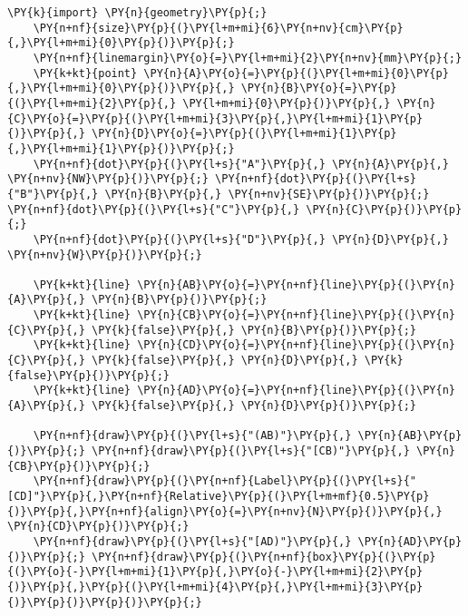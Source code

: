 \begin{Verbatim}[commandchars=\\\{\}]
    \PY{k}{import} \PY{n}{geometry}\PY{p}{;}
    \PY{n+nf}{size}\PY{p}{(}\PY{l+m+mi}{6}\PY{n+nv}{cm}\PY{p}{,}\PY{l+m+mi}{0}\PY{p}{)}\PY{p}{;}
    \PY{n+nf}{linemargin}\PY{o}{=}\PY{l+m+mi}{2}\PY{n+nv}{mm}\PY{p}{;}
    \PY{k+kt}{point} \PY{n}{A}\PY{o}{=}\PY{p}{(}\PY{l+m+mi}{0}\PY{p}{,}\PY{l+m+mi}{0}\PY{p}{)}\PY{p}{,} \PY{n}{B}\PY{o}{=}\PY{p}{(}\PY{l+m+mi}{2}\PY{p}{,} \PY{l+m+mi}{0}\PY{p}{)}\PY{p}{,} \PY{n}{C}\PY{o}{=}\PY{p}{(}\PY{l+m+mi}{3}\PY{p}{,}\PY{l+m+mi}{1}\PY{p}{)}\PY{p}{,} \PY{n}{D}\PY{o}{=}\PY{p}{(}\PY{l+m+mi}{1}\PY{p}{,}\PY{l+m+mi}{1}\PY{p}{)}\PY{p}{;}
    \PY{n+nf}{dot}\PY{p}{(}\PY{l+s}{"A"}\PY{p}{,} \PY{n}{A}\PY{p}{,} \PY{n+nv}{NW}\PY{p}{)}\PY{p}{;} \PY{n+nf}{dot}\PY{p}{(}\PY{l+s}{"B"}\PY{p}{,} \PY{n}{B}\PY{p}{,} \PY{n+nv}{SE}\PY{p}{)}\PY{p}{;} \PY{n+nf}{dot}\PY{p}{(}\PY{l+s}{"C"}\PY{p}{,} \PY{n}{C}\PY{p}{)}\PY{p}{;}
    \PY{n+nf}{dot}\PY{p}{(}\PY{l+s}{"D"}\PY{p}{,} \PY{n}{D}\PY{p}{,} \PY{n+nv}{W}\PY{p}{)}\PY{p}{;}

    \PY{k+kt}{line} \PY{n}{AB}\PY{o}{=}\PY{n+nf}{line}\PY{p}{(}\PY{n}{A}\PY{p}{,} \PY{n}{B}\PY{p}{)}\PY{p}{;}
    \PY{k+kt}{line} \PY{n}{CB}\PY{o}{=}\PY{n+nf}{line}\PY{p}{(}\PY{n}{C}\PY{p}{,} \PY{k}{false}\PY{p}{,} \PY{n}{B}\PY{p}{)}\PY{p}{;}
    \PY{k+kt}{line} \PY{n}{CD}\PY{o}{=}\PY{n+nf}{line}\PY{p}{(}\PY{n}{C}\PY{p}{,} \PY{k}{false}\PY{p}{,} \PY{n}{D}\PY{p}{,} \PY{k}{false}\PY{p}{)}\PY{p}{;}
    \PY{k+kt}{line} \PY{n}{AD}\PY{o}{=}\PY{n+nf}{line}\PY{p}{(}\PY{n}{A}\PY{p}{,} \PY{k}{false}\PY{p}{,} \PY{n}{D}\PY{p}{)}\PY{p}{;}

    \PY{n+nf}{draw}\PY{p}{(}\PY{l+s}{"(AB)"}\PY{p}{,} \PY{n}{AB}\PY{p}{)}\PY{p}{;} \PY{n+nf}{draw}\PY{p}{(}\PY{l+s}{"[CB)"}\PY{p}{,} \PY{n}{CB}\PY{p}{)}\PY{p}{;}
    \PY{n+nf}{draw}\PY{p}{(}\PY{n+nf}{Label}\PY{p}{(}\PY{l+s}{"[CD]"}\PY{p}{,}\PY{n+nf}{Relative}\PY{p}{(}\PY{l+m+mf}{0.5}\PY{p}{)}\PY{p}{,}\PY{n+nf}{align}\PY{o}{=}\PY{n+nv}{N}\PY{p}{)}\PY{p}{,} \PY{n}{CD}\PY{p}{)}\PY{p}{;}
    \PY{n+nf}{draw}\PY{p}{(}\PY{l+s}{"[AD)"}\PY{p}{,} \PY{n}{AD}\PY{p}{)}\PY{p}{;} \PY{n+nf}{draw}\PY{p}{(}\PY{n+nf}{box}\PY{p}{(}\PY{p}{(}\PY{o}{-}\PY{l+m+mi}{1}\PY{p}{,}\PY{o}{-}\PY{l+m+mi}{2}\PY{p}{)}\PY{p}{,}\PY{p}{(}\PY{l+m+mi}{4}\PY{p}{,}\PY{l+m+mi}{3}\PY{p}{)}\PY{p}{)}\PY{p}{)}\PY{p}{;}
\end{Verbatim}
